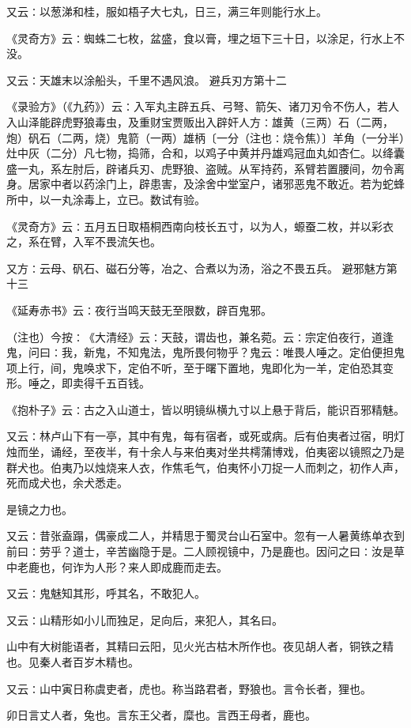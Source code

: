 \documentclass[a4paper,12pt,UTF8,twoside]{ctexbook}
\begin{document}
又云∶以葱涕和桂，服如梧子大七丸，日三，满三年则能行水上。

《灵奇方》云∶蜘蛛二七枚，盆盛，食以膏，埋之垣下三十日，以涂足，行水上不没。

又云∶天雄末以涂船头，千里不遇风浪。
避兵刃方第十二

《录验方》（《九药》）云∶入军丸主辟五兵、弓弩、箭矢、诸刀刃令不伤人，若人入山泽能辟虎野狼毒虫，及重财宝贾贩出入辟奸人方∶雄黄（三两）石（二两，炮）矾石（二两，烧）鬼箭（一两）雄柄〔一分（注也∶烧令焦）〕羊角（一分半）灶中灰（二分）凡七物，捣筛，合和，以鸡子中黄并丹雄鸡冠血丸如杏仁。以绛囊盛一丸，系左肘后，辟诸兵刃、虎野狼、盗贼。从军持药，系臂若置腰间，勿令离身。居家中者以药涂门上，辟患害，及涂舍中堂室户，诸邪恶鬼不敢近。若为蛇蜂所中，以一丸涂毒上，立已。数试有验。

《灵奇方》云∶五月五日取梧桐西南向枝长五寸，以为人，螈蚕二枚，并以彩衣之，系在臂，入军不畏流矢也。

又方∶云母、矾石、磁石分等，冶之、合煮以为汤，浴之不畏五兵。
避邪魅方第十三

《延寿赤书》云∶夜行当鸣天鼓无至限数，辟百鬼邪。

（注也）今按∶《大清经》云∶天鼓，谓齿也，兼名菀。云∶宗定伯夜行，道逢鬼，问曰∶我，新鬼，不知鬼法，鬼所畏何物乎？鬼云∶唯畏人唾之。定伯便担鬼项上行，间，鬼唤求下，定伯不听，至于曙下置地，鬼即化为一羊，定伯恐其变形。唾之，即卖得千五百钱。

《抱朴子》云∶古之入山道士，皆以明镜纵横九寸以上悬于背后，能识百邪精魅。

又云∶林卢山下有一亭，其中有鬼，每有宿者，或死或病。后有伯夷者过宿，明灯烛而坐，诵经，至夜半，有十余人与来伯夷对坐共樗蒲博戏，伯夷密以镜照之乃是群犬也。伯夷乃以烛烧来人衣，作焦毛气，伯夷怀小刀捉一人而刺之，初作人声，死而成犬也，余犬悉走。

是镜之力也。

又云∶昔张盍蹋，偶豪成二人，并精思于蜀灵台山石室中。忽有一人暑黄练单衣到前曰∶劳乎？道士，辛苦幽隐于是。二人顾视镜中，乃是鹿也。因问之曰∶汝是草中老鹿也，何诈为人形？来人即成鹿而走去。

又云∶鬼魅知其形，呼其名，不敢犯人。

又云∶山精形如小儿而独足，足向后，来犯人，其名曰。

山中有大树能语者，其精曰云阳，见火光古枯木所作也。夜见胡人者，铜铁之精也。见秦人者百岁木精也。

又云∶山中寅日称虞吏者，虎也。称当路君者，野狼也。言令长者，狸也。

卯日言丈人者，兔也。言东王父者，糜也。言西王母者，鹿也。
\end{document}

